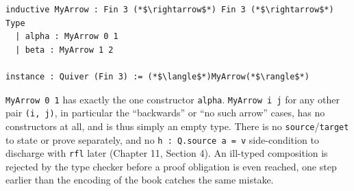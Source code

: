 \begin{lstlisting}
inductive MyArrow : Fin 3 (*$\rightarrow$*) Fin 3 (*$\rightarrow$*) Type
  | alpha : MyArrow 0 1
  | beta : MyArrow 1 2

instance : Quiver (Fin 3) := (*$\langle$*)MyArrow(*$\rangle$*)
\end{lstlisting}

\texttt{MyArrow 0 1} has exactly the one constructor \texttt{alpha}. \texttt{MyArrow i j} for any other pair \texttt{(i, j)}, in particular the ``backwards'' or ``no such arrow'' cases, has no constructors at all, and is thus simply an empty type. There is no \texttt{source}/\texttt{target} to state or prove separately, and no \texttt{h : Q.source a = v} side-condition to discharge with \texttt{rfl} later (Chapter 11, Section 4). An ill-typed composition is rejected by the type checker before a proof obligation is even reached, one step earlier than the encoding of the book catches the same mistake.
